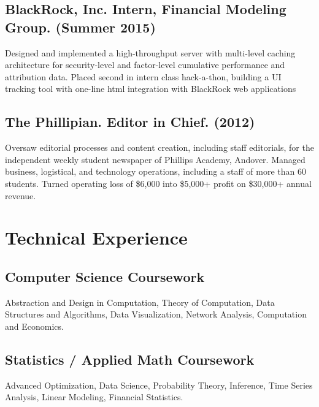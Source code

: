 \documentclass[letterpaper]{amsart}
\renewenvironment{itemize}{
  \begin{list}{}{
    \setlength{\leftmargin}{1.5em}
  }
}{
  \end{list}
}
\begin{document}
\subsection*{BlackRock, Inc. Intern, Financial Modeling Group. (Summer 2015)}
\begin{itemize}
\item Designed and implemented a high-throughput server with multi-level caching architecture for security-level
and factor-level cumulative performance and attribution data. Placed second in intern class hack-a-thon,
building a UI tracking tool with one-line html integration with BlackRock web applications
\end{itemize}

\subsection*{The Phillipian. Editor in Chief. (2012)}
\begin{itemize}
\item Oversaw editorial processes and content creation, including staff editorials, for the independent 
weekly student newspaper of Phillips Academy, Andover. Managed business,
logistical, and technology operations, including a staff of more than 60 students. Turned operating loss
of \$6,000 into \$5,000+ profit on \$30,000+ annual revenue.
\end{itemize}


\section*{Technical Experience}
\subsection*{Computer Science Coursework}
\begin{itemize}
\item Abstraction and Design in Computation, Theory of Computation, Data Structures and Algorithms,
 Data Visualization, Network Analysis, Computation and Economics.
\end{itemize}
\subsection*{Statistics / Applied Math Coursework}
\begin{itemize}
\item Advanced Optimization, Data Science, Probability Theory, Inference, Time Series Analysis, Linear Modeling, Financial Statistics.  
\end{itemize}
\end{document}

